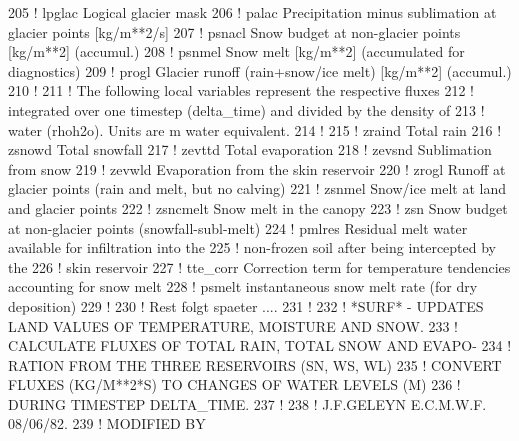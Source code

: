 \begin{DoxyCode}
205   \textcolor{comment}{! lpglac        Logical glacier mask}
206   \textcolor{comment}{! palac         Precipitation minus sublimation at glacier points [kg/m**2/s]}
207   \textcolor{comment}{! psnacl        Snow budget at non-glacier points [kg/m**2] (accumul.)}
208   \textcolor{comment}{! psnmel        Snow melt [kg/m**2] (accumulated for diagnostics)}
209   \textcolor{comment}{! progl         Glacier runoff (rain+snow/ice melt) [kg/m**2] (accumul.)}
210   \textcolor{comment}{!}
211   \textcolor{comment}{! The following local variables represent the respective fluxes}
212   \textcolor{comment}{! integrated over one timestep (delta\_time) and divided by the density of}
213   \textcolor{comment}{! water (rhoh2o). Units are m water equivalent.}
214   \textcolor{comment}{!}
215   \textcolor{comment}{! zraind        Total rain}
216   \textcolor{comment}{! zsnowd        Total snowfall}
217   \textcolor{comment}{! zevttd        Total evaporation}
218   \textcolor{comment}{! zevsnd        Sublimation from snow}
219   \textcolor{comment}{! zevwld        Evaporation from the skin reservoir}
220   \textcolor{comment}{! zrogl         Runoff at glacier points (rain and melt, but no calving)}
221   \textcolor{comment}{! zsnmel        Snow/ice melt at land and glacier points}
222   \textcolor{comment}{! zsncmelt      Snow melt in the canopy}
223   \textcolor{comment}{! zsn           Snow budget at non-glacier points (snowfall-subl-melt)}
224   \textcolor{comment}{! pmlres        Residual melt water available for infiltration into the}
225   \textcolor{comment}{!               non-frozen soil after being intercepted by the}
226   \textcolor{comment}{!               skin reservoir}
227   \textcolor{comment}{! tte\_corr      Correction term for temperature tendencies accounting for snow melt}
228   \textcolor{comment}{! psmelt        instantaneous snow melt rate (for dry deposition)}
229   \textcolor{comment}{!}
230   \textcolor{comment}{!       Rest folgt spaeter ....}
231   \textcolor{comment}{!}
232   \textcolor{comment}{!     *SURF* - UPDATES LAND VALUES OF TEMPERATURE, MOISTURE AND SNOW.}
233   \textcolor{comment}{!              CALCULATE FLUXES OF TOTAL RAIN, TOTAL SNOW AND EVAPO-}
234   \textcolor{comment}{!              RATION FROM THE THREE RESERVOIRS (SN, WS, WL)}
235   \textcolor{comment}{!              CONVERT FLUXES (KG/M**2*S) TO CHANGES OF WATER LEVELS (M)}
236   \textcolor{comment}{!              DURING TIMESTEP DELTA\_TIME.}
237   \textcolor{comment}{!}
238   \textcolor{comment}{!     J.F.GELEYN     E.C.M.W.F.     08/06/82.}
239   \textcolor{comment}{!     MODIFIED BY}

\end{DoxyCode}

